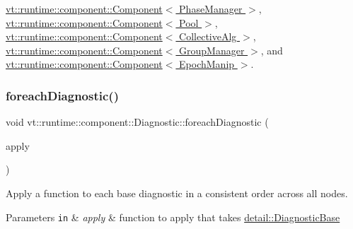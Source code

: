 \hyperlink{structvt_1_1runtime_1_1component_1_1_component_adaf8bd995d4c91702e2ff7806ad9e695}{vt\+::runtime\+::component\+::\+Component$<$ Phase\+Manager $>$}, \hyperlink{structvt_1_1runtime_1_1component_1_1_component_adaf8bd995d4c91702e2ff7806ad9e695}{vt\+::runtime\+::component\+::\+Component$<$ Pool $>$}, \hyperlink{structvt_1_1runtime_1_1component_1_1_component_adaf8bd995d4c91702e2ff7806ad9e695}{vt\+::runtime\+::component\+::\+Component$<$ Collective\+Alg $>$}, \hyperlink{structvt_1_1runtime_1_1component_1_1_component_adaf8bd995d4c91702e2ff7806ad9e695}{vt\+::runtime\+::component\+::\+Component$<$ Group\+Manager $>$}, and \hyperlink{structvt_1_1runtime_1_1component_1_1_component_adaf8bd995d4c91702e2ff7806ad9e695}{vt\+::runtime\+::component\+::\+Component$<$ Epoch\+Manip $>$}.

\mbox{\label{structvt_1_1runtime_1_1component_1_1_diagnostic_a1d6951af40ad0b4020860c0b21b1a85c}} 
\subsubsection{\texorpdfstring{foreach\+Diagnostic()}{foreachDiagnostic()}}
{\footnotesize\ttfamily void vt\+::runtime\+::component\+::\+Diagnostic\+::foreach\+Diagnostic (\begin{DoxyParamCaption}\item[{std\+::function$<$ void(\hyperlink{structvt_1_1runtime_1_1component_1_1detail_1_1_diagnostic_base}{detail\+::\+Diagnostic\+Base} $\ast$)$>$}]{apply }\end{DoxyParamCaption})}



Apply a function to each base diagnostic in a consistent order across all nodes. 


\begin{DoxyParams}[1]{Parameters}
\mbox{\tt in}  & {\em apply} & function to apply that takes {\ttfamily \hyperlink{structvt_1_1runtime_1_1component_1_1detail_1_1_diagnostic_base}{detail\+::\+Diagnostic\+Base}} \\
\hline
\end{DoxyParams}
\mbox{\label{structvt_1_1runtime_1_1component_1_1_diagnostic_a9c1f4174ac87bb6ae0ec186a08adbbbb}} 
